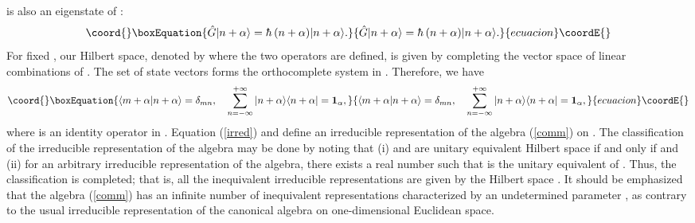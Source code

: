 \documentclass[a4paper,12pt]{article}
\begin{document}
is also an eigenstate of \myHighlight{$\hg$}\coordHE{}:
\begin{equation}\coord{}\boxEquation{
\hg\ket{n+\alpha}=\hbar~(n+\alpha)\ket{n+\alpha}.
\label{irred}
}{
\hg\ket{n+\alpha}=\hbar~(n+\alpha)\ket{n+\alpha}.
}{ecuacion}\coordE{}\end{equation} 
For fixed \myHighlight{$\alpha$}\coordHE{}, our Hilbert space, denoted 
by \coordHE{} where the two operators \myHighlight{$\hg, \hw$}\coordHE{}
are defined, is given by completing the vector space of linear combinations
of \coordHE{}.
The set of state vectors forms the orthocomplete system in 
\coordHE{}. Therefore, we have 
\begin{equation}\coord{}\boxEquation{
\norm{m+\alpha}{n+\alpha}=\delta_{mn}, \quad
\sum_{n=-\infty}^{+\infty}\ket{n+\alpha}\bra{n+\alpha}={\bf 1}_{\alpha},
\label{irred2}
}{
\norm{m+\alpha}{n+\alpha}=\delta_{mn}, \quad
\sum_{n=-\infty}^{+\infty}\ket{n+\alpha}\bra{n+\alpha}={\bf 1}_{\alpha},
}{ecuacion}\coordE{}\end{equation}
where \coordHE{} is an identity operator in \coordHE{}.
Equation (\ref{irred}) and \coordHE{} define 
an irreducible representation of the algebra (\ref{comm}) 
on \coordHE{}. The classification of the irreducible 
representation of the algebra may be done 
by noting that (i) \coordHE{} and 
\coordHE{} are unitary equivalent 
Hilbert space if and only if \coordHE{} and (ii)
for an arbitrary irreducible representation \coordHE{} of the algebra, 
there exists a real number \myHighlight{$\alpha$}\coordHE{} such that \coordHE{} is 
the unitary equivalent of \coordHE{}.     
Thus, the classification is completed; that is, all the inequivalent 
irreducible representations 
are given by the Hilbert space \coordHE{}.
It should be emphasized that the algebra (\ref{comm}) 
has an infinite number of inequivalent representations characterized 
by an undetermined parameter \myHighlight{$\alpha$}\coordHE{}, as contrary to the usual 
irreducible representation of the canonical algebra on 
one-dimensional Euclidean space.
\end{document}
